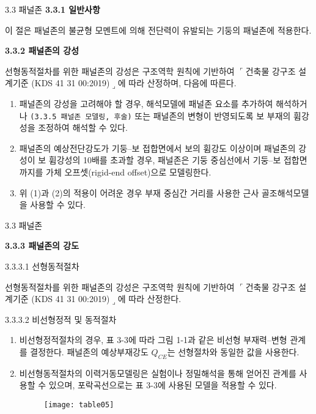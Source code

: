 
	\begin{frame}{3.3 패널존}
	\textbf{3.3.1 일반사항}
	
	이 절은 패널존의 불균형 모멘트에 의해 전단력이 유발되는 기둥의 패널존에 적용한다.  
	
	\textbf{3.3.2 패널존의 강성}
		
	선형동적절차를 위한 패널존의 강성은 구조역학 원칙에 기반하여 $\ulcorner$건축물 강구조 설계기준 (KDS 41 31 00:2019)$\lrcorner$에 따라 산정하며, 다음에 따른다. 
	
	\begin{enumerate}
		\item[(1)] 패널존의 강성을 고려해야 할 경우, 해석모델에 패널존 요소를 추가하여 해석하거나 \texttt{(3.3.5 패널존 모델링, 후술)} 또는 패널존의 변형이 반영되도록 보 부재의 휨강성을 조정하여 해석할 수 있다.  
		\item[(2)] 패널존의 예상전단강도가 기둥--보 접합면에서 보의 휨강도 이상이며 패널존의 강성이 보 휨강성의 10배를 초과할 경우, 패널존은 기둥 중심선에서  기둥--보 접합면까지를 가체 오프셋(rigid-end offset)으로 모델링한다. 
		\item[(3)] 위 (1)과 (2)의 적용이 어려운 경우 부재 중심간 거리를 사용한 근사 골조해석모델을 사용할 수 있다. 
	\end{enumerate}
	\end{frame}
	


	\begin{frame}{3.3 패널존}

	\textbf{3.3.3 패널존의 강도}

3.3.3.1 선형동적절차	

선형동적절차를 위한 패널존의 강성은 구조역학 원칙에 기반하여 $\ulcorner$건축물 강구조 설계기준 (KDS 41 31 00:2019)$\lrcorner$에 따라 산정한다. 

3.3.3.2 비선형정적 및 동적절차

	\begin{enumerate}
		\item[(1)] 비선형정적절차의 경우, 표 3-3에 따라 그림 1-1과 같은 비선형 부재력--변형 관계를 결정한다. 패널존의 예상부재강도 $Q_{CE}$는 선형절차와 동일한 값을 사용한다. 
		\item[(2)] 비선형동적절차의 이력거동모델링은 실험이나 정밀해석을 통해 얻어진 관계를 사용할 수 있으며, 포락곡선으로는 표 3-3에 사용된 모델을 적용할 수 있다. 
		\begin{figure}
			\centering
			\texttt{[image: table05]}
		\end{figure}
	\end{enumerate}

	\end{frame}	
	
